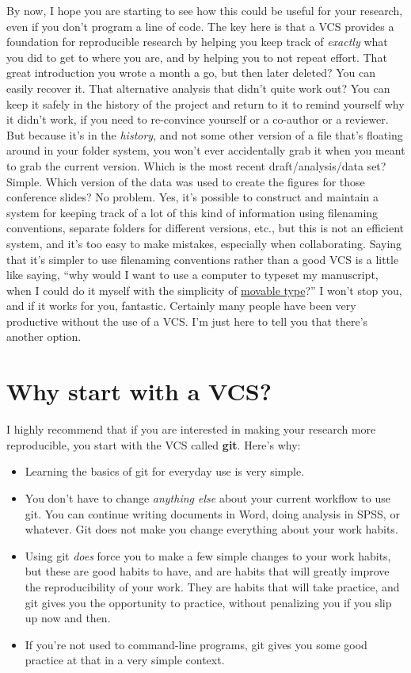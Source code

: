 \documentclass{article}
\begin{document}
By now, I hope you are starting to see how this could be useful for your research, even if you don't program a line of code. The key here is that a VCS provides a foundation for reproducible research by helping you keep track of \emph{exactly} what you did to get to where you are, and by helping you to not repeat effort. That great introduction you wrote a month a go, but then later deleted?  You can easily recover it.  That alternative analysis that didn't quite work out?  You can keep it safely in the history of the project and return to it to remind yourself why it didn't work, if you need to re-convince yourself or a co-author or a reviewer. But because it's in the \emph{history}, and not some other version of a file that's floating around in your folder system, you won't ever accidentally grab it when you meant to grab the current version. Which is the most recent draft/analysis/data set? Simple. Which version of the data was used to create the figures for those conference slides?  No problem. Yes, it's possible to construct and maintain a system for keeping track of a lot of this kind of information using filenaming conventions, separate folders for different versions, etc., but this is not an efficient system, and it's too easy to make mistakes, especially when collaborating.  Saying that it's simpler to use filenaming conventions rather than a good VCS is a little like saying, ``why would I want to use a computer to typeset my manuscript, when I could do it myself with the simplicity of \href{http://en.wikipedia.org/wiki/Movable_type}{movable type}?''  I won't stop you, and if it works for you, fantastic. Certainly many people have been very productive without the use of a VCS. I'm just here to tell you that there's another option.
\section{Why start with a VCS?}
\label{sec-3}

I highly recommend that if you are interested in making your research more reproducible, you start with the VCS called \textbf{git}. Here's why:

\begin{itemize}
\item Learning the basics of git for everyday use is very simple.
\item You don't have to change \emph{anything else} about your current workflow to use git. You can continue writing documents in Word, doing analysis in SPSS, or whatever.  Git does not make you change everything about your work habits.
\item Using git \emph{does} force you to make a few simple changes to your work habits, but these are good habits to have, and are habits that will greatly improve the reproducibility of your work. They are habits that will take practice, and git gives you the opportunity to practice, without penalizing you if you slip up now and then.
\item If you're not used to command-line programs, git gives you some good practice at that in a very simple context.
\end{itemize}
\end{document}
